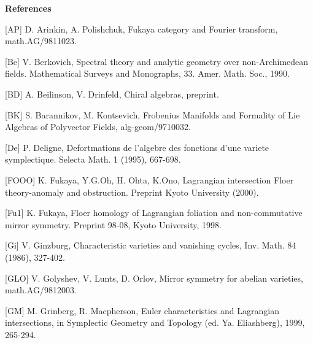 \documentclass[a4paper,12pt]{article}
\begin{document}
\vspace{10mm}

{\bf References}

\vspace{3mm}


[AP] D. Arinkin, A. Polishchuk, Fukaya category and Fourier transform,
math.AG/9811023.


\vspace{2mm}

[Be] V. Berkovich, Spectral theory and analytic geometry over
non-Archimedean fields. Mathematical Surveys and Monographs, 33.
Amer. Math. Soc., 1990.

\vspace{2mm}

[BD] A. Beilinson, V. Drinfeld, Chiral algebras, preprint.

\vspace{2mm}

[BK] S. Barannikov, M. Kontsevich,
Frobenius Manifolds and Formality of Lie Algebras of Polyvector Fields, 
alg-geom/9710032. 

\vspace{2mm}

[De] P. Deligne, Defortmations de l'algebre des fonctions d'une
variete symplectique. Selecta Math. 1 (1995), 667-698.

\vspace{2mm}

[FOOO] K. Fukaya, Y.G.Oh, H. Ohta, K.Ono, Lagrangian intersection
Floer theory-anomaly and obstruction. Preprint Kyoto University (2000).
 
 \vspace{2mm}

[Fu1] K. Fukaya, Floer homology of Lagrangian foliation and 
non-commutative mirror symmetry. Preprint 98-08, Kyoto University, 1998.

\vspace{2mm}

[Gi] V. Ginzburg, Characteristic varieties and vanishing cycles,
Inv. Math. 84 (1986), 327-402.

\vspace{2mm}

 [GLO] V. Golyshev, V. Lunts, D. Orlov, Mirror symmetry for abelian varieties,
 math.AG/9812003.
   
\vspace{2mm} 

[GM] M. Grinberg, R. Macpherson, Euler characteristics and Lagrangian
intersections, in Symplectic Geometry and Topology (ed. Ya. Eliashberg),
1999, 265-294. 
\end{document}
